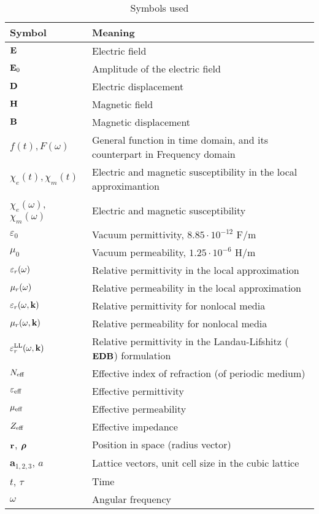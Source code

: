 \begin{table}[ht]   \caption{Symbols used}  \label{tb_symbols} \centering %
\begin{tabular}{ll}
 \toprule
Symbol & Meaning	\\
 \hline
$\mathbf{E}$ 		& Electric field\\
$\mathbf{E}_0$ 		& Amplitude of the electric field\\
$\mathbf{D}$ 		& Electric displacement\\
$\mathbf{H}$ 		& Magnetic field\\
$\mathbf{B}$ 		& Magnetic displacement\\
$f(t), F(\omega)$ & General function in time domain, and its counterpart in Frequency domain \\
$\chi_e(t),\chi_m(t)$	& Electric and magnetic susceptibility in the local approximantion \\ %
$\chi_e(\omega)$, $\chi_m(\omega)$ 	& Electric and magnetic susceptibility\\
$\varepsilon_0$ &Vacuum permittivity, $8.85\cdot10^{-12}$ F/m\\
$\mu_0$		&Vacuum permeability, $1.25\cdot10^{-6}$ H/m \\
$\varepsilon_r(\omega)$ &Relative permittivity in the local approximation\\
$\mu_r(\omega)$ &Relative permeability in the local approximation\\
$\varepsilon_r(\omega, {\mathbf{k}})$ &Relative permittivity for nonlocal media\\
$\mu_r(\omega, {\mathbf{k}})$ &Relative permeability for nonlocal media\\
$\varepsilon_r^\text{LL}(\omega, {\mathbf{k}})$ &Relative permittivity in the Landau-Lifshitz ($\mathbf{E}\mathbf{D}\mathbf{B}$) formulation\\
$N_{\text{eff} }$ 	& Effective index of refraction (of periodic medium)\\
$\varepsilon_{\text{eff} }$ 	& Effective permittivity\\
$\mu_{\text{eff} }$ 	& Effective permeability\\
$Z_{\text{eff} }$ 	& Effective impedance\\
${\mathbf{r}}$, $\boldsymbol{\rho}$ 		& Position in space (radius vector)\\
$\mathbf{a}_{1,2,3}$, $a$ 		& Lattice vectors, unit cell size in the cubic lattice \\
$t$, $\tau$ 		& Time\\
$\omega$ 	& Angular frequency\\

\end{tabular}
\end{table}
